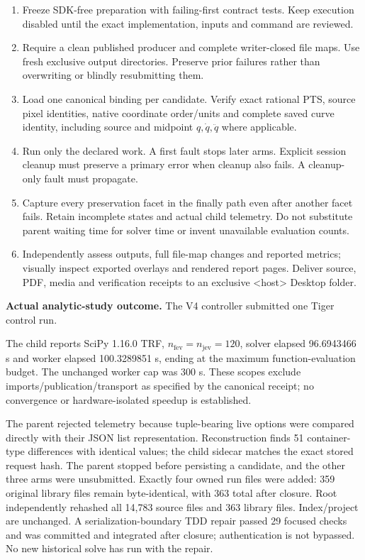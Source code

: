 \documentclass[11pt,a4paper]{article}
\newcommand{\code}[1]{\texttt{\small\detokenize{#1}}}
\begin{document}
\begin{enumerate}[leftmargin=*,itemsep=4pt]
\item Freeze SDK-free preparation with failing-first contract tests. Keep execution disabled until the exact implementation, inputs and command are reviewed.
\item Require a clean published producer and complete writer-closed file maps. Use fresh exclusive output directories. Preserve prior failures rather than overwriting or blindly resubmitting them.
\item Load one canonical binding per candidate. Verify exact rational PTS, source pixel identities, native coordinate order/units and complete saved curve identity, including source and midpoint $q,\dot q,\ddot q$ where applicable.
\item Run only the declared work. A first fault stops later arms. Explicit session cleanup must preserve a primary error when cleanup also fails. A cleanup-only fault must propagate.
\item Capture every preservation facet in the finally path even after another facet fails. Retain incomplete states and actual child telemetry. Do not substitute parent waiting time for solver time or invent unavailable evaluation counts.
\item Independently assess outputs, full file-map changes and reported metrics; visually inspect exported overlays and rendered report pages. Deliver source, PDF, media and verification receipts to an exclusive <host> Desktop folder.
\end{enumerate}

\textbf{Actual analytic-study outcome.} The V4 controller submitted one Tiger control run.\par
\code{be2ac6697820420297590c470dec7c78}\par
The child reports SciPy 1.16.0 TRF, $n_{\mathrm{fev}}=n_{\mathrm{jev}}=120$, solver elapsed 96.6943466 s and worker elapsed 100.3289851 s, ending at the maximum function-evaluation budget. The unchanged worker cap was 300 s. These scopes exclude imports/publication/transport as specified by the canonical receipt; no convergence or hardware-isolated speedup is established.

The parent rejected telemetry because tuple-bearing live options were compared directly with their JSON list representation. Reconstruction finds 51 container-type differences with identical values; the child sidecar matches the exact stored request hash. The parent stopped before persisting a candidate, and the other three arms were unsubmitted. Exactly four owned run files were added: 359 original library files remain byte-identical, with 363 total after closure. Root independently rehashed all 14,783 source files and 363 library files. Index/project are unchanged. A serialization-boundary TDD repair passed 29 focused checks and was committed and integrated after closure; authentication is not bypassed. No new historical solve has run with the repair.
\end{document}
